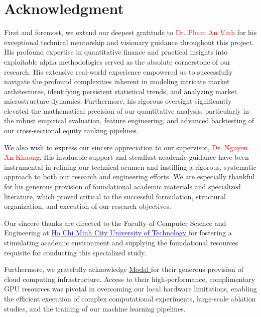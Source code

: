 \part*{Acknowledgment}
First and foremost, we extend our deepest gratitude to \textcolor{red}{Dr. Pham An Vinh} for his exceptional technical mentorship and visionary guidance throughout this project. His profound expertise in quantitative finance and practical insights into exploitable alpha methodologies served as the absolute cornerstone of our research. His extensive real-world experience empowered us to successfully navigate the profound complexities inherent in modeling intricate market architectures, identifying persistent statistical trends, and analyzing market microstructure dynamics. Furthermore, his rigorous oversight significantly elevated the mathematical precision of our quantitative analysis, particularly in the robust empirical evaluation, feature engineering, and advanced backtesting of our cross-sectional equity ranking pipelines.

\medskip

We also wish to express our sincere appreciation to our supervisor, \textcolor{red}{Dr. Nguyen An Khuong}. His invaluable support and steadfast academic guidance have been instrumental in refining our technical acumen and instilling a rigorous, systematic approach to both our research and engineering efforts. We are especially thankful for his generous provision of foundational academic materials and specialized literature, which proved critical to the successful formulation, structural organization, and execution of our research objectives.

\medskip

Our sincere thanks are directed to the Faculty of Computer Science and Engineering at \href{https://hcmut.edu.vn}{\textcolor{blue}{Ho Chi Minh City University of Technology} } for fostering a stimulating academic environment and supplying the foundational resources requisite for conducting this specialized study.

\medskip

Furthermore, we gratefully acknowledge \href{https://modal.com}{\textcolor{modal-color}{Modal} } for their generous provision of cloud computing infrastructure. Access to their high-performance, complimentary \ac{GPU} resources was pivotal in overcoming our local hardware limitations, enabling the efficient execution of complex computational experiments, large-scale ablation studies, and the training of our machine learning pipelines.

